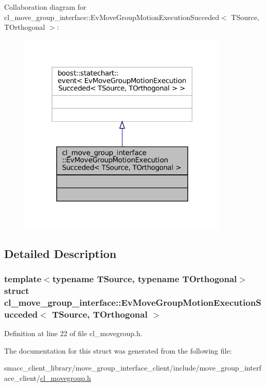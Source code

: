 Collaboration diagram for cl\+\_\+move\+\_\+group\+\_\+interface\+:\+:Ev\+Move\+Group\+Motion\+Execution\+Succeded$<$ T\+Source, T\+Orthogonal $>$\+:
\nopagebreak
\begin{figure}[H]
\begin{center}
\leavevmode
\includegraphics[width=284pt]{structcl__move__group__interface_1_1EvMoveGroupMotionExecutionSucceded__coll__graph}
\end{center}
\end{figure}


\subsection{Detailed Description}
\subsubsection*{template$<$typename T\+Source, typename T\+Orthogonal$>$\newline
struct cl\+\_\+move\+\_\+group\+\_\+interface\+::\+Ev\+Move\+Group\+Motion\+Execution\+Succeded$<$ T\+Source, T\+Orthogonal $>$}



Definition at line 22 of file cl\+\_\+movegroup.\+h.



The documentation for this struct was generated from the following file\+:\begin{DoxyCompactItemize}
\item 
smacc\+\_\+client\+\_\+library/move\+\_\+group\+\_\+interface\+\_\+client/include/move\+\_\+group\+\_\+interface\+\_\+client/\hyperlink{cl__movegroup_8h}{cl\+\_\+movegroup.\+h}\end{DoxyCompactItemize}
